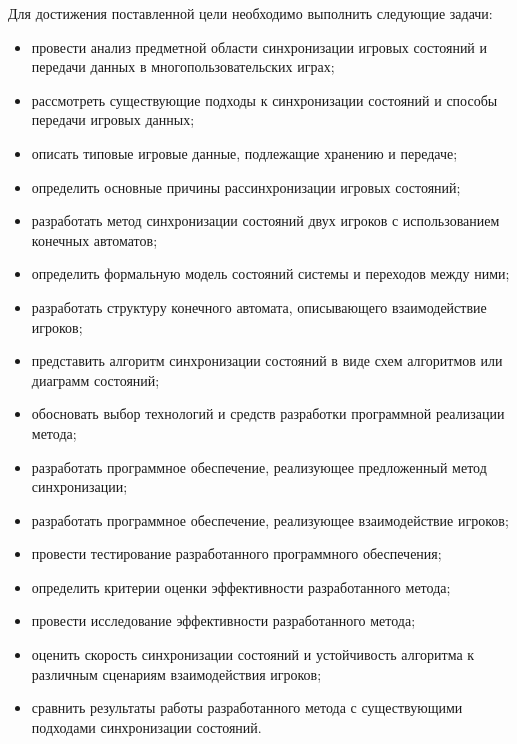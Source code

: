 Для достижения поставленной цели необходимо выполнить следующие задачи:
\begin{itemize}
	\item провести анализ предметной области синхронизации игровых состояний и передачи данных в многопользовательских играх;
	\item рассмотреть существующие подходы к синхронизации состояний и способы передачи игровых данных;
	\item описать типовые игровые данные, подлежащие хранению и передаче;
	\item определить основные причины рассинхронизации игровых состояний;
	\item разработать метод синхронизации состояний двух игроков с использованием конечных автоматов;
	\item определить формальную модель состояний системы и переходов между ними;
	\item разработать структуру конечного автомата, описывающего взаимодействие игроков;
	\item представить алгоритм синхронизации состояний в виде схем алгоритмов или диаграмм состояний;
	\item обосновать выбор технологий и средств разработки программной реализации метода;
	\item разработать программное обеспечение, реализующее предложенный метод синхронизации;
	\item разработать программное обеспечение, реализующее взаимодействие игроков;
	\item провести тестирование разработанного программного обеспечения;
	\item определить критерии оценки эффективности разработанного метода;
	\item провести исследование эффективности разработанного метода;
	\item оценить скорость синхронизации состояний и устойчивость алгоритма к различным сценариям взаимодействия игроков;
	\item сравнить результаты работы разработанного метода с существующими подходами синхронизации состояний.
\end{itemize}
